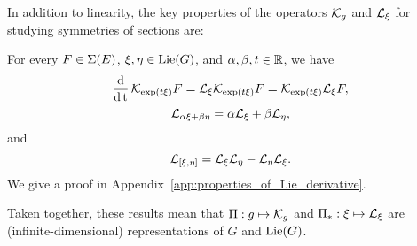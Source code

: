 \documentclass[twoside,11pt]{article}
\begin{document}
In addition to linearity, the key properties of the operators ${\mathcal{K}}_g$ and ${\mathcal{L}}_\xi$ for studying symmetries of sections are:
\begin{proposition}
    \label{prop:properties_of_Lie_derivative}
    For every $F\in\operatorname{\Sigma}(E)$, $\xi, \eta \in\operatorname{Lie}(G)$, and $\alpha, \beta, t \in\mathbb{R}$, we have
    \begin{equation}
        \operatorname{\frac{\operatorname{\mathrm{d}}}{\operatorname{\mathrm{d}} t}} {\mathcal{K}}_{\exp(t\xi)}F 
        = {\mathcal{L}}_{\xi} {\mathcal{K}}_{\exp(t\xi)} F
        = {\mathcal{K}}_{\exp(t\xi)} {\mathcal{L}}_{\xi} F,
        \label{eqn:Lie_derivative_as_generator}
    \end{equation}
    \begin{equation}
        {\mathcal{L}}_{\alpha\xi + \beta \eta} = \alpha {\mathcal{L}}_{\xi} + \beta {\mathcal{L}}_{\eta},
        \label{eqn:linearity_of_Lie_derivative_wrt_Lie_algebra}
    \end{equation}
    and
    \begin{equation}
        {\mathcal{L}}_{[\xi, \eta]} 
        = {\mathcal{L}}_{\xi}{\mathcal{L}}_{\eta} - {\mathcal{L}}_{\eta}{\mathcal{L}}_{\xi}.
        \label{eqn:Lie_derivative_commutator}
    \end{equation}
    We give a proof in Appendix~\ref{app:properties_of_Lie_derivative}.
\end{proposition}
Taken together, these results mean that $\Pi:g \mapsto {\mathcal{K}}_g$ and $\Pi_*:\xi \mapsto {\mathcal{L}}_{\xi}$ are (infinite-dimensional) representations of $G$ and $\operatorname{Lie}(G)$.
\end{document}
